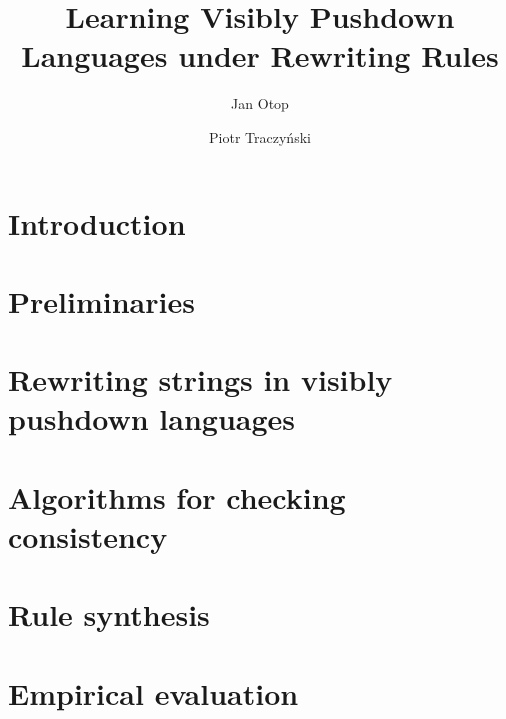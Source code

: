 \documentclass[a4paper,cleveref, autoref, thm-restate]{lipics-v2021}
\title{Learning Visibly Pushdown Languages under Rewriting Rules}
\author{Jan Otop}{University of Wroc\l{}aw}{jan.otop@uwr.edu.pl}{https://orcid.org/0000-0002-8804-8011}{}
\author{Piotr Traczyński}{University of Wroc\l{}aw}{}{}{} %
\begin{document}
\maketitle


\section{Introduction}


\section{Preliminaries}



\section{Rewriting strings in visibly pushdown languages}



\section{Algorithms for checking consistency}



\section{Rule synthesis}


\section{Empirical evaluation}


%







\end{document}
